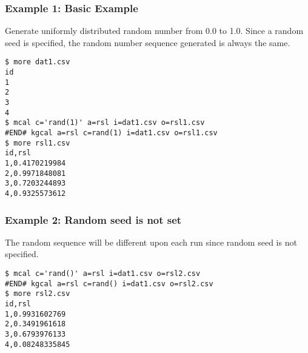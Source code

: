 \subsubsection*{Example 1: Basic Example}

Generate uniformly distributed random number from 0.0 to 1.0.
Since a random seed is specified, the random number sequence generated is always the same.


\begin{Verbatim}[baselinestretch=0.7,frame=single]
$ more dat1.csv
id
1
2
3
4
$ mcal c='rand(1)' a=rsl i=dat1.csv o=rsl1.csv
#END# kgcal a=rsl c=rand(1) i=dat1.csv o=rsl1.csv
$ more rsl1.csv
id,rsl
1,0.4170219984
2,0.9971848081
3,0.7203244893
4,0.9325573612
\end{Verbatim}
\subsubsection*{Example 2: Random seed is not set}

The random sequence will be different upon each run since random seed is not specified.


\begin{Verbatim}[baselinestretch=0.7,frame=single]
$ mcal c='rand()' a=rsl i=dat1.csv o=rsl2.csv
#END# kgcal a=rsl c=rand() i=dat1.csv o=rsl2.csv
$ more rsl2.csv
id,rsl
1,0.9931602769
2,0.3491961618
3,0.6793976133
4,0.08248335845
\end{Verbatim}
